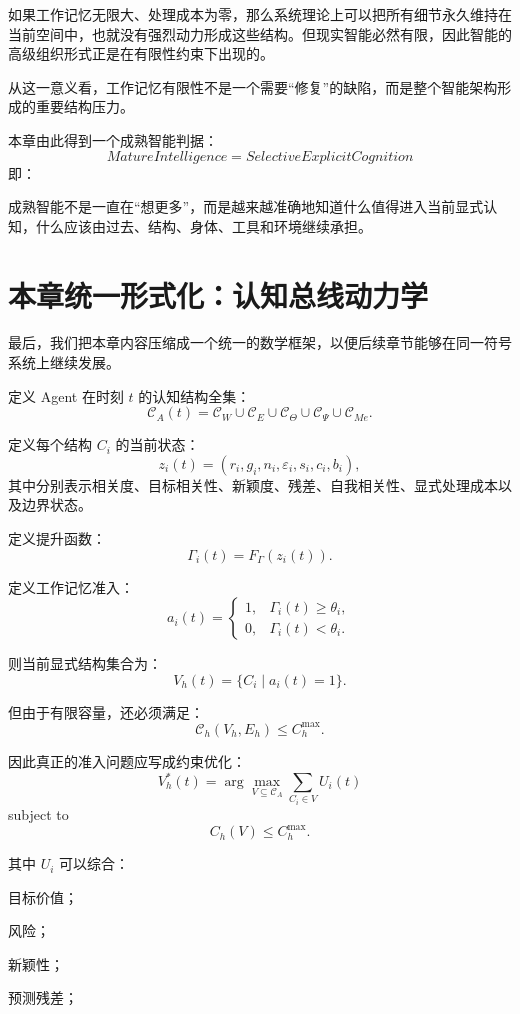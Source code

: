 如果工作记忆无限大、处理成本为零，那么系统理论上可以把所有细节永久维持在当前空间中，也就没有强烈动力形成这些结构。但现实智能必然有限，因此智能的高级组织形式正是在有限性约束下出现的。

从这一意义看，工作记忆有限性不是一个需要“修复”的缺陷，而是整个智能架构形成的重要结构压力。

本章由此得到一个成熟智能判据：
\[
\boxed{
MatureIntelligence
=
SelectiveExplicitCognition
}
\]
即：
\begin{statementbox}
成熟智能不是一直在“想更多”，而是越来越准确地知道什么值得进入当前显式认知，什么应该由过去、结构、身体、工具和环境继续承担。
\end{statementbox}

\section{本章统一形式化：认知总线动力学}

最后，我们把本章内容压缩成一个统一的数学框架，以便后续章节能够在同一符号系统上继续发展。

定义 Agent 在时刻 $t$ 的认知结构全集：
\[
\mathcal C_A(t)
=
\mathcal C_W
\cup
\mathcal C_E
\cup
\mathcal C_\Theta
\cup
\mathcal C_\Psi
\cup
\mathcal C_{Me}.
\]

定义每个结构 $C_i$ 的当前状态：
\[
z_i(t)
=
\left(
r_i,
g_i,
n_i,
\varepsilon_i,
s_i,
c_i,
b_i
\right),
\]
其中分别表示相关度、目标相关性、新颖度、残差、自我相关性、显式处理成本以及边界状态。

定义提升函数：
\[
\Gamma_i(t)
=
F_\Gamma(z_i(t)).
\]

定义工作记忆准入：
\[
a_i(t)
=
\begin{cases}
1,&\Gamma_i(t)\geq\theta_i,\\
0,&\Gamma_i(t)<\theta_i.
\end{cases}
\]

则当前显式结构集合为：
\[
V_h(t)
=
\{C_i\mid a_i(t)=1\}.
\]

但由于有限容量，还必须满足：
\[
\mathcal C_h
\left(
V_h,E_h
\right)
\leq
C_h^{\max}.
\]

因此真正的准入问题应写成约束优化：
\[
V_h^*(t)
=
\arg\max_{V\subseteq\mathcal C_A}
\sum_{C_i\in V}
U_i(t)
\]
subject to
\[
C_h(V)\leq C_h^{\max}.
\]

其中 $U_i$ 可以综合：

目标价值；

风险；

新颖性；

预测残差；

